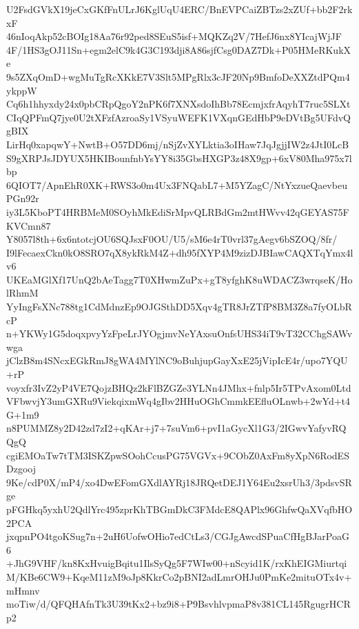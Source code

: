 U2FsdGVkX19jeCxGKfFnULrJ6KglUqU4ERC/BnEVPCaiZBTzs2xZUf+bb2F2rkxF
46nIoqAkp52cBOIg18Aa76r92ped8SEuS5isf+MQKZq2V/7HefJ6nx8YIcajWjJF
4F/1HS3gOJ11Sn+egm2elC9k4G3C193dji8A86sjfCsg0DAZ7Dk+P05HMeRKukXe
9s5ZXqOmD+wgMuTgRcXKkE7V3Slt5MPgRlx3cJF20Np9BmfoDeXXZtdPQm4ykppW
Cq6h1hhyxdy24x0pbCRpQgoY2nPK6f7XNXsdoIhBb78EcmjxfrAqyhT7ruc5SLXt
CIqQPFmQ7jye0U2tXFzfAzroaSy1VSyuWEFK1VXqnGEdHbP9eDVtBg5UFdvQgBIX
LirHq0xapqwY+NwtB+O57DD6mj/nSjZvXYLktia3oIHaw7JqJgjjIW2z4JtI0LcB
S9gXRPJsJDYUX5HKIBounfnbYsYY8i35GbsHXGP3z48X9gp+6xV80Mha975x7lbp
6QIOT7/ApnEhR0XK+RWS3o0m4Ux3FNQabL7+M5YZagC/NtYxzueQaevbeuPGn92r
iy3L5KboPT4HRBMeM0SOyhMkEdiSrMpvQLRBdGm2mtHWvv42qGEYAS75FKVCmn87
Y8057l8th+6x6ntotcjOU6SQJsxF0OU/U5/sM6e4rT0vrl37gAegv6bSZOQ/8fr/
I9lFecaexCkn0kO8SRO7qX8ykRkM4Z+dh95fXYP4M9zizDJBIawCAQXTqYmx4lv6
UKEaMGlXf17UnQ2bAeTagg7T0XHwmZuPx+gT8yfghK8uWDACZ3wrqseK/HolRhmM
YyIngFsXNc788tg1CdMdnzEp9OJGSthDD5Xqv4gTR8JrZTfP8BM3Z8a7fyOLbRcP
n+YKWy1G5doqxpvyYzFpeLrJYOgjmvNeYAxsuOnfsUHS34iT9vT32CChgSAWvwga
jClzB8m4SNcxEGkRmJ8gWA4MYlNC9oBuhjupGayXxE25jVipIcE4r/upo7YQU+rP
voyxfr3IvZ2yP4VE7QojzBHQz2kFlBZGZe3YLNn4JMhx+fnlp5Ir5TPvAxom0Ltd
VFbwvjY3umGXRu9ViekqixmWq4gIbv2HHuOGhCmmkEEfluOLnwb+2wYd+t4G+1m9
n8PUMMZ8y2D42zd7zI2+qKAr+j7+7suVm6+pvI1aGycXl1G3/2IGwvYafyvRQQgQ
cgiEMOaTw7tTM3ISKZpwSOohCcusPG75VGVx+9CObZ0AxFm8yXpN6RodESDzgooj
9Ke/cdP0X/mP4/xo4DwEFomGXdlAYRj18JRQetDEJ1Y64Eu2xsrUh3/3pdsvSRge
pFGHkq5yxhU2QdlYrc495zprKhTBGmDkC3FMdcE8QAPlx96GhfwQaXVqfbHO2PCA
jxqpnPO4tgoKSug7n+2uH6UofwOHio7edCtLs3/CGJgAwcdSPuaCfHgBJarPoaG6
+JhG9VHF/kn8KxHvuigBqitu1IlsSyQg5F7WIw00+nScyid1K/rxKhEIGMiurtqi
M/KBe6CW9+KqeM11zM9oJp8KkrCo2pBNI2adLmrOHJu0PmKe2mituOTx4v+mHmnv
moTiw/d/QFQHAfnTk3U39tKx2+bz9i8+P9BsvhlvpmaP8v381CL145RgugrHCRp2
